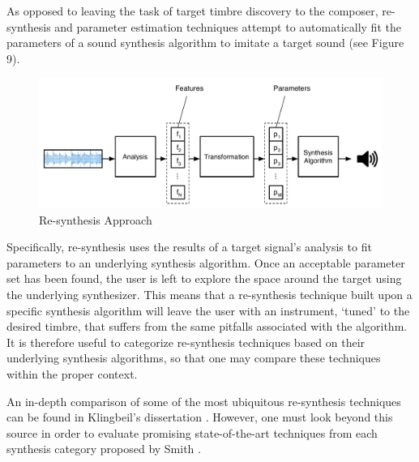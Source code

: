 \documentclass[12pt]{report} 	%
\numberwithin{figure}{chapter}
\numberwithin{table}{chapter}
\numberwithin{equation}{chapter}
\begin{document}
\begin{flushleft}
As opposed to leaving the task of target timbre discovery to the composer, re-synthesis and parameter estimation techniques attempt to automatically fit the parameters of a sound synthesis algorithm to imitate a target sound (see Figure 9). \begin{figure}[h!]
\begin{center}
\includegraphics[scale=0.5]{ResynthesisIdea}
\caption[Re-synthesis]{Re-synthesis Approach}
\end{center}
\vspace{6pt}
\end{figure}
Specifically, re-synthesis uses the results of a target signal's analysis to fit parameters to an underlying synthesis algorithm. Once an acceptable parameter set has been found, the user is left to explore the space around the target using the underlying synthesizer. This means that a re-synthesis technique built upon a specific synthesis algorithm will leave the user with an instrument, `tuned' to the desired timbre, that suffers from the same pitfalls associated with the algorithm. It is therefore useful to categorize re-synthesis techniques based on their underlying synthesis algorithms, so that one may compare these techniques within the proper context.

An in-depth comparison of some of the most ubiquitous re-synthesis techniques can be found in Klingbeil's dissertation \cite{Klingbeil:2009lo}. However, one must look beyond this source in order to evaluate promising state-of-the-art techniques from each synthesis category proposed by Smith \cite{III:1991hc}.


\end{flushleft}
\end{document}
